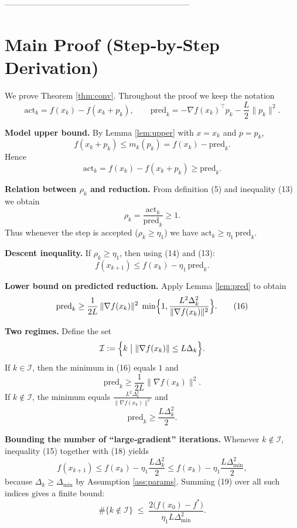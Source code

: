 \documentclass{article}
\begin{document}
--------------------------------------------------------------------

\section*{Main Proof (Step‑by‑Step Derivation)}
We prove Theorem \ref{thm:conv}.  Throughout the proof we keep the notation
\[
\text{act}_{k}=f(x_{k})-f(x_{k}+p_{k}),\qquad
\text{pred}_{k}= -\nabla f(x_{k})^{\top}p_{k}-\frac{L}{2}\|p_{k}\|^{2}.
\]

\begin{enumerate}[label=\textbf{[Step \arabic*]}]
\item \textbf{Model upper bound.}  
By Lemma \ref{lem:upper} with $x=x_{k}$ and $p=p_{k}$,
\[
f(x_{k}+p_{k})\le m_{k}(p_{k})=f(x_{k})-\text{pred}_{k}.
\tag{12}
\]
Hence
\[
\text{act}_{k}=f(x_{k})-f(x_{k}+p_{k})\ge\text{pred}_{k}.
\tag{13}
\]

\item \textbf{Relation between $\rho_{k}$ and reduction.}  
From definition (5) and inequality (13) we obtain
\[
\rho_{k}
=\frac{\text{act}_{k}}{\text{pred}_{k}}
\ge 1.
\tag{14}
\]
Thus whenever the step is accepted ($\rho_{k}\ge\eta_{1}$) we have
$\text{act}_{k}\ge\eta_{1}\,\text{pred}_{k}$.

\item \textbf{Descent inequality.}  
If $\rho_{k}\ge\eta_{1}$, then using (14) and (13):
\[
f(x_{k+1})\le f(x_{k})-\eta_{1}\,\text{pred}_{k}.
\tag{15}
\]

\item \textbf{Lower bound on predicted reduction.}  
Apply Lemma \ref{lem:pred} to obtain
\[
\text{pred}_{k}\ge
\frac{1}{2L}\,\|\nabla f(x_{k})\|^{2}\;
\min\Bigl\{1,\frac{L^{2}\Delta_{k}^{2}}{\|\nabla f(x_{k})\|^{2}}\Bigr\}.
\tag{16}
\]

\item \textbf{Two regimes.}  
Define the set
\[
\mathcal{I}:=\Bigl\{k\;\big|\; \|\nabla f(x_{k})\|\le L\Delta_{k}\Bigr\}.
\]
If $k\in\mathcal{I}$, then the minimum in (16) equals $1$ and
\[
\text{pred}_{k}\ge\frac{1}{2L}\|\nabla f(x_{k})\|^{2}.
\tag{17}
\]
If $k\notin\mathcal{I}$, the minimum equals
$\frac{L^{2}\Delta_{k}^{2}}{\|\nabla f(x_{k})\|^{2}}$ and
\[
\text{pred}_{k}\ge\frac{L\Delta_{k}^{2}}{2}.
\tag{18}
\]

\item \textbf{Bounding the number of ``large‑gradient'' iterations.}  
Whenever $k\notin\mathcal{I}$, inequality (15) together with (18) yields
\[
f(x_{k+1})\le f(x_{k})-\eta_{1}\frac{L\Delta_{k}^{2}}{2}
\le f(x_{k})-\eta_{1}\frac{L\Delta_{\min}^{2}}{2},
\tag{19}
\]
because $\Delta_{k}\ge\Delta_{\min}$ by Assumption \ref{ass:params}.
Summing (19) over all such indices gives a finite bound:
\[
\#\{k\notin\mathcal{I}\}\;\le\;
\frac{2\bigl(f(x_{0})-f^{*}\bigr)}{\eta_{1}L\Delta_{\min}^{2}}.
\tag{20}
\]


\end{enumerate}
\end{document}
